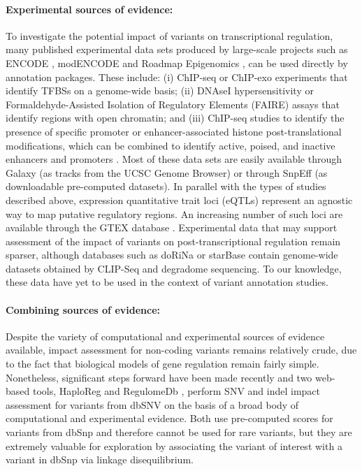 \paragraph{Experimental sources of evidence:} To investigate the potential impact of variants on transcriptional regulation, many published experimental data sets produced by large-scale projects such as ENCODE \cite{encode2012integrated}, modENCODE \cite{celniker2009unlocking} and Roadmap Epigenomics \cite{bernstein2010nih}, can be used directly by annotation packages. These include: (i) ChIP-seq or ChIP-exo experiments that identify TFBSs on a genome-wide basis; (ii) DNAseI hypersensitivity or Formaldehyde-Assisted Isolation of Regulatory Elements (FAIRE) assays that identify regions with open chromatin; and (iii) ChIP-seq studies to identify the presence of specific promoter or enhancer-associated histone post-translational modifications, which can be combined to identify active, poised, and inactive enhancers and promoters \cite{ray2013compendium}. Most of these data sets are easily available through Galaxy \cite{goecks2010galaxy} (as tracks from the UCSC Genome Browser) or through SnpEff (as downloadable pre-computed datasets). In parallel with the types of studies described above, expression quantitative trait loci (eQTLs) represent an agnostic way to map putative regulatory regions. An increasing number of such loci are available through the GTEX database  \cite{lonsdale2013genotype}. Experimental data that may support assessment of the impact of variants on post-transcriptional regulation remain sparser, although databases such as doRiNa  \cite{anders2011dorina} or starBase  \cite{yang2011starbase} contain genome-wide datasets obtained by CLIP-Seq and degradome sequencing. To our knowledge, these data have yet to be used in the context of variant annotation studies.

\paragraph{Combining sources of evidence:} Despite the variety of computational and experimental sources of evidence available, impact assessment for non-coding variants remains relatively crude, due to the fact that biological models of gene regulation remain fairly simple. 
Nonetheless, significant steps forward have been made recently and two web-based tools, HaploReg  \cite{ward2012haploreg} and RegulomeDb  \cite{boyle2012annotation}, perform SNV and indel impact assessment for variants from dbSNV on the basis of a broad body of computational and experimental evidence. Both use pre-computed scores for variants from dbSnp and therefore cannot be used for rare variants, but they are extremely valuable for exploration by associating the variant of interest with a variant in dbSnp via linkage disequilibrium. 


